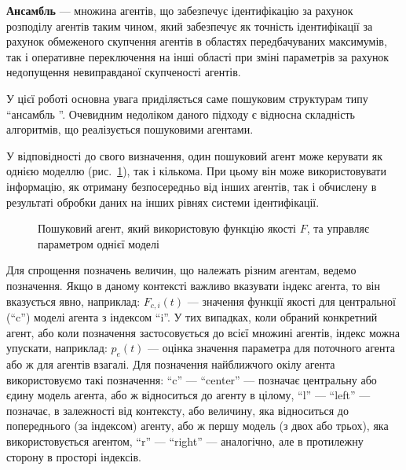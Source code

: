 \documentclass[a4paper,13pt]{atuaref}
\begin{document}
\textbf {Ансамбль} ---
множина агентів, що забезпечує ідентифікацію за рахунок розподілу агентів таким
чином, який забезпечує як точність ідентифікації за рахунок обмеженого
скупчення агентів в областях передбачуваних максимумів, так і оперативне
переключення на інші області при зміні параметрів за рахунок недопущення
невиправданої скупченості агентів.

У цієї роботі основна увага приділяється саме пошуковим структурам типу
``ансамбль ''. Очевидним недоліком даного підходу є відносна складність
алгоритмів, що реалізується пошуковими агентами.

У відповідності до свого визначення, один пошуковий агент може керувати як
однією моделлю (рис.~\ref{atu:f:agent1}), так і кількома. При цьому він
може використовувати інформацію, як отриману безпосередньо від інших агентів,
так і обчислену в результаті обробки даних на інших рівнях системи
ідентифікації.

\begin{figure}[htb!]
\begin{center}

\end{center}
\caption{Пошуковий агент, який використовую функцію якості $F$, та управляє параметром однієї моделі}
\label{atu:f:agent1}
\end{figure}

Для спрощення позначень величин, що належать різним агентам, ведемо
позначення. Якщо в даному контексті важливо вказувати індекс агента, то він
вказується явно, наприклад: $F_{c, i} (t)$ --- значення функції якості для
центральної (``c'') моделі агента з індексом ``i''. У тих випадках, коли
обраний конкретний агент, або коли позначення застосовується до всієї множині
агентів, індекс можна упускати, наприклад: $p_e (t)$
--- оцінка значення параметра для поточного агента або ж для агентів взагалі.
Для позначення найближчого окілу агента використовуємо такі позначення:
``c'' --- ``center'' --- позначає центральну або єдину модель агента, або ж
відноситься до агенту в цілому, ``l'' --- ``left'' --- позначає, в
залежності від контексту, або величину, яка відноситься до попереднього (за
індексом) агенту, або ж першу модель (з двох або трьох), яка використовується
агентом, ``r'' --- ``right'' --- аналогічно, але в протилежну сторону в
просторі індексів.
\end{document}
